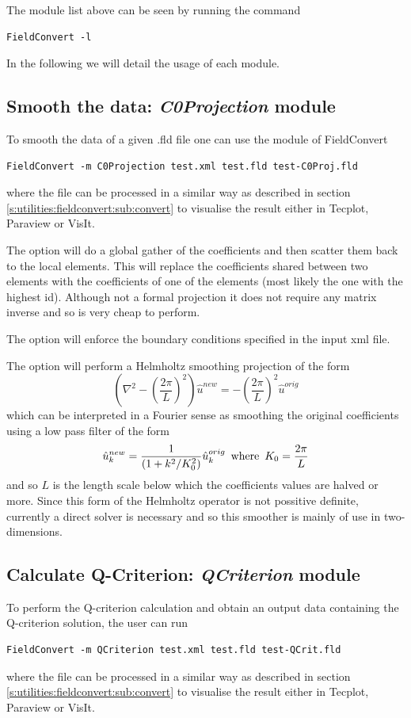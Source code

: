 The module list above can be seen by running the command
%
\begin{lstlisting}[style=BashInputStyle]
FieldConvert -l
\end{lstlisting}
%
In the following we will detail the usage of each module.
%
%
%

\subsection{Smooth the data: \textit{C0Projection} module}
To smooth the data of a given .fld file one can
use the  module of FieldConvert
%
\begin{lstlisting}[style=BashInputStyle]
FieldConvert -m C0Projection test.xml test.fld test-C0Proj.fld
\end{lstlisting}
%
where the file  can be processed in a similar
way as described in section \ref{s:utilities:fieldconvert:sub:convert}
to visualise the result either in Tecplot, Paraview or VisIt.

The option  will do a global gather of the
coefficients and then scatter them back to the local elements. This
will replace the coefficients shared between two elements with the
coefficients of one of the elements (most likely the one with the
highest id). Although not a formal projection it does not require any
matrix inverse and so is very cheap to perform.

The option  will enforce the boundary conditions
specified in the input xml file.

The option  will perform a Helmholtz
smoothing projection of the form
\[
\left (\nabla^2 - \left (\frac{2 \pi}{L}\right )^2 \right ) \hat{u}^{new} =
-\left (\frac{2 \pi}{L}\right )^2 \hat{u}^{orig}
\]
which can be interpreted in a Fourier sense as smoothing the original
coefficients using a low pass filter of the form
\[
\hat{u}_k^{new} = \frac{1}{(1 + k^2/K_0^2)} \hat{u}_k^{orig} \mbox{\,  where  \,}
K_0 = \frac{2 \pi}{L}
\]
and so $L$ is the length scale below which the coefficients values are
halved or more. Since this form of the Helmholtz operator is not
possitive definite, currently a direct solver is necessary and so this
smoother is mainly of use in two-dimensions.

\subsection{Calculate Q-Criterion: \textit{QCriterion} module}
To perform the Q-criterion calculation and obtain an output
data containing the Q-criterion solution, the user can run
%
\begin{lstlisting}[style=BashInputStyle]
FieldConvert -m QCriterion test.xml test.fld test-QCrit.fld
\end{lstlisting}
%
where the file  can be processed in a similar
way as described in section \ref{s:utilities:fieldconvert:sub:convert}
to visualise the result either in Tecplot, Paraview or VisIt.
%
%
%


